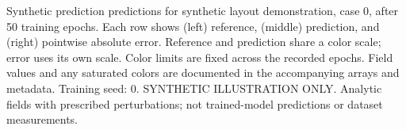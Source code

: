 \caption{Synthetic prediction predictions for synthetic layout demonstration, case 0, after 50 training epochs. Each row shows (left) reference, (middle) prediction, and (right) pointwise absolute error. Reference and prediction share a color scale; error uses its own scale. Color limits are fixed across the recorded epochs. Field values and any saturated colors are documented in the accompanying arrays and metadata. Training seed: 0. SYNTHETIC ILLUSTRATION ONLY. Analytic fields with prescribed perturbations; not trained-model predictions or dataset measurements.}
